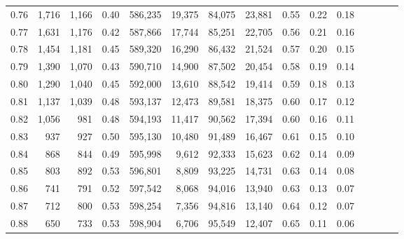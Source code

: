 \begin{tabular}{rrrcrrrrrrrrrrr}
0.76 &   1,716 &  1,166 &                                       0.40 &  586,235 &   19,375 &   84,075 &   23,881 &  0.55 &  0.22 &                         0.18 \\
0.77 &   1,631 &  1,176 &                                       0.42 &  587,866 &   17,744 &   85,251 &   22,705 &  0.56 &  0.21 &                         0.16 \\
0.78 &   1,454 &  1,181 &                                       0.45 &  589,320 &   16,290 &   86,432 &   21,524 &  0.57 &  0.20 &                         0.15 \\
0.79 &   1,390 &  1,070 &                                       0.43 &  590,710 &   14,900 &   87,502 &   20,454 &  0.58 &  0.19 &                         0.14 \\
0.80 &   1,290 &  1,040 &                                       0.45 &  592,000 &   13,610 &   88,542 &   19,414 &  0.59 &  0.18 &                         0.13 \\
0.81 &   1,137 &  1,039 &                                       0.48 &  593,137 &   12,473 &   89,581 &   18,375 &  0.60 &  0.17 &                         0.12 \\
0.82 &   1,056 &    981 &                                       0.48 &  594,193 &   11,417 &   90,562 &   17,394 &  0.60 &  0.16 &                         0.11 \\
0.83 &     937 &    927 &                                       0.50 &  595,130 &   10,480 &   91,489 &   16,467 &  0.61 &  0.15 &                         0.10 \\
0.84 &     868 &    844 &                                       0.49 &  595,998 &    9,612 &   92,333 &   15,623 &  0.62 &  0.14 &                         0.09 \\
0.85 &     803 &    892 &                                       0.53 &  596,801 &    8,809 &   93,225 &   14,731 &  0.63 &  0.14 &                         0.08 \\
0.86 &     741 &    791 &                                       0.52 &  597,542 &    8,068 &   94,016 &   13,940 &  0.63 &  0.13 &                         0.07 \\
0.87 &     712 &    800 &                                       0.53 &  598,254 &    7,356 &   94,816 &   13,140 &  0.64 &  0.12 &                         0.07 \\
0.88 &     650 &    733 &                                       0.53 &  598,904 &    6,706 &   95,549 &   12,407 &  0.65 &  0.11 &                         0.06 \\

\end{tabular}
